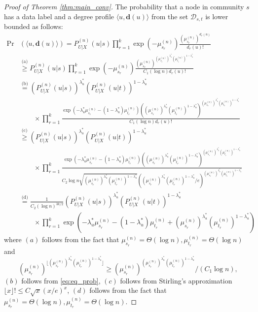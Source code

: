 \documentclass[11pt]{article}
\theoremstyle{plain}
\theoremstyle{definition}
\begin{document}
\begin{proof}[Proof of Theorem \ref{thm:main_conv}]
The probability that a node in community $s$ has a 
data label and a degree profile $\langle u, \mathbf{d}(u) \rangle$ from the set $\mathcal{D}_{s,t}$
is lower bounded as follows:
\begin{align}
\text{Pr} & (\langle u, \mathbf{d}(u) \rangle)  = 
P^{(n)}_{U|X}(u|s) \prod_{r=1}^k 
\exp(-\mu_{s_r}^{(n)}) 
\frac{(\mu_{s_r}^{(n)})^{d_r(u)}}
	 { d_r(u)!}  \nonumber \\
 & \stackrel{\text{(a)}}{\ge}
P^{(n)}_{U|X}(u|s) \prod_{r=1}^k 
\exp(-\mu_{s_r}^{(n)}) 
\frac{(\mu_{s_r}^{(n)})^{(\mu_{s_r}^{(n)})^{\lambda_u^*} (\mu_{t_r}^{(n)})^{1-\lambda_u^*}}}
{ C_1 (\log n) d_r(u)!}  \nonumber \\
& \stackrel{\text{(b)}}{=}
(P^{(n)}_{U|X}(u|s))^{\lambda_u^*} (P^{(n)}_{U|X}(u|t))^{1-\lambda_u^*} \nonumber \\
&\quad\quad \times \prod_{r=1}^k
\frac{
\exp(-\lambda_u^* \mu_{s_r}^{(n)} -  (1-\lambda_u^*)\mu_{t_r}^{(n)}) ((\mu_{s_r}^{(n)})^{\lambda_u^*} 
(\mu_{t_r}^{(n)}) ^{1-\lambda_u^*})^{(\mu_{s_r}^{(n)})^{\lambda_u^*} 
(\mu_{t_r}^{(n)}) ^{1-\lambda_u^*}}
}
{C_1 (\log n) d_r(u)!} \nonumber \\
& \stackrel{\text{(c)}}{\ge}
(P^{(n)}_{U|X}(u|s))^{\lambda_u^*} (P^{(n)}_{U|X}(u|t))^{1-\lambda_u^*} \nonumber \\
&\quad\quad \times \prod_{r=1}^k
\frac{
	\exp(-\lambda_u^* \mu_{s_r}^{(n)} -  (1-\lambda_u^*) \mu_{t_r}^{(n)}) ((\mu_{s_r}^{(n)})^{\lambda_u^*} 
	(\mu_{t_r}^{(n)})^{1-\lambda_u^*})^{(\mu_{s_r}^{(n)})^{\lambda_u^*} 
		(\mu_{t_r}^{(n)}) ^{1-\lambda_u^*}}
}
{C_2 \log n \sqrt{ (\mu_{s_r}^{(n)})^{\lambda_u^*} 
		(\mu_{t_r}^{(n)}) ^{1-\lambda_u^*} }  ((\mu_{s_r}^{(n)})^{\lambda_u^*} (\mu_{t_r}^{(n)}) ^{1-\lambda_u^*} /e )^{(\mu_{s_r}^{(n)})^{\lambda_u^*} (\mu_{t_r}^{(n)}) ^{1-\lambda_u^*} } }  \nonumber \\
& \stackrel{\text{(d)}}{=}
\frac{1}{C_2 (\log n)^{3 k/2}}
(P^{(n)}_{U|X}(u|s))^{\lambda_u^*} (P^{(n)}_{U|X}(u|t))^{1-\lambda_u^*} \nonumber \\
&\quad\quad \times \prod_{r=1}^k
\exp(-\lambda_u^* \mu_{s_r}^{(n)} -  (1-\lambda_u^*) \mu_{t_r}^{(n)} + (\mu_{s_r}^{(n)})^{\lambda_u^*} (\mu_{t_r}^{(n)}) ^{1-\lambda_u^*}  )  
\label{eq:prob_lowerbound}
\end{align}
where $(a)$ follows from the fact that $\mu_{s_r}^{(n)} = \Theta(\log n), \mu_{t_r}^{(n)} = \Theta(\log n)$ and 
\[(\mu_{s_r}^{(n)})^{\lfloor (\mu_{s_r}^{(n)})^{\lambda_u^*} (\mu_{t_r}^{(n)})^{1-\lambda_u^*} \rfloor}
\ge 
(\mu_{s_r}^{(n)})^{(\mu_{s_r}^{(n)})^{\lambda_u^*} (\mu_{t_r}^{(n)})^{1-\lambda_u^*}} / (C_1\log n),\] $(b)$ follows from \eqref{eq:eq_prob}, $(c)$
follows from Stirling's approximation $\lfloor x \rfloor! \le C \sqrt{x} (x/e)^x$, $(d)$ follows from the fact that 
$\mu_{s_r}^{(n)} = \Theta(\log n), \mu_{t_r}^{(n)} = \Theta(\log n)$.


\end{proof}
\end{document}
